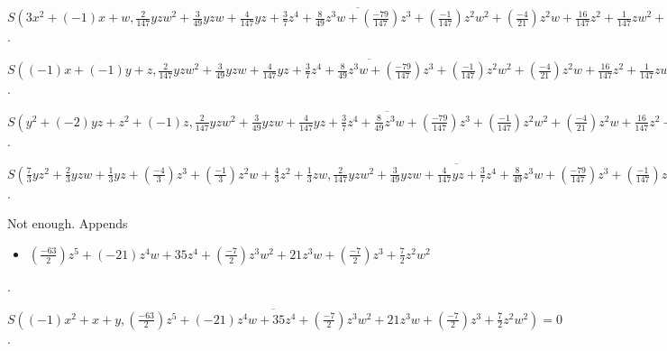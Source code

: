 $\overline{S(3x^{2}+(-1)x+w, \frac{2}{147}yzw^{2}+\frac{3}{49}yzw+\frac{4}{147}yz+\frac{3}{7}z^{4}+\frac{8}{49}z^{3}w+(\frac{-79}{147})z^{3}+(\frac{-1}{147})z^{2}w^{2}+(\frac{-4}{21})z^{2}w+\frac{16}{147}z^{2}+\frac{1}{147}zw^{2}+\frac{4}{147}zw)} = (\frac{-1}{84})yzw+(\frac{-1}{21})yz+(\frac{-63}{2})z^{5}+(\frac{-39}{2})z^{4}w+\frac{137}{4}z^{4}+(\frac{-5}{2})z^{3}w^{2}+\frac{113}{6}z^{3}w+(\frac{-215}{84})z^{3}+\frac{1}{6}z^{2}w^{3}+\frac{29}{12}z^{2}w^{2}+\frac{5}{7}z^{2}w+(\frac{-4}{21})z^{2}+(\frac{-1}{6})zw^{3}+\frac{1}{12}zw^{2}+(\frac{-1}{21})zw$.

$\overline{S((-1)x+(-1)y+z, \frac{2}{147}yzw^{2}+\frac{3}{49}yzw+\frac{4}{147}yz+\frac{3}{7}z^{4}+\frac{8}{49}z^{3}w+(\frac{-79}{147})z^{3}+(\frac{-1}{147})z^{2}w^{2}+(\frac{-4}{21})z^{2}w+\frac{16}{147}z^{2}+\frac{1}{147}zw^{2}+\frac{4}{147}zw)} = (\frac{-1}{4})yzw+(-1)yz+(\frac{-27}{2})z^{5}+(-9)z^{4}w+\frac{69}{4}z^{4}+(\frac{-3}{2})z^{3}w^{2}+\frac{21}{2}z^{3}w+(\frac{-7}{4})z^{3}+\frac{7}{4}z^{2}w^{2}+(\frac{-1}{2})z^{2}w+(-2)z^{2}+(\frac{-1}{4})zw^{2}+(-1)zw$.

$\overline{S(y^{2}+(-2)yz+z^{2}+(-1)z, \frac{2}{147}yzw^{2}+\frac{3}{49}yzw+\frac{4}{147}yz+\frac{3}{7}z^{4}+\frac{8}{49}z^{3}w+(\frac{-79}{147})z^{3}+(\frac{-1}{147})z^{2}w^{2}+(\frac{-4}{21})z^{2}w+\frac{16}{147}z^{2}+\frac{1}{147}zw^{2}+\frac{4}{147}zw)} = \frac{1}{4}yzw+yz+(-18)z^{5}+(-12)z^{4}w+\frac{71}{4}z^{4}+(-2)z^{3}w^{2}+\frac{21}{2}z^{3}w+(\frac{-7}{4})z^{3}+\frac{7}{4}z^{2}w^{2}+\frac{1}{2}z^{2}w+2z^{2}+\frac{1}{4}zw^{2}+zw$.

$\overline{S(\frac{7}{3}yz^{2}+\frac{2}{3}yzw+\frac{1}{3}yz+(\frac{-4}{3})z^{3}+(\frac{-1}{3})z^{2}w+\frac{4}{3}z^{2}+\frac{1}{3}zw, \frac{2}{147}yzw^{2}+\frac{3}{49}yzw+\frac{4}{147}yz+\frac{3}{7}z^{4}+\frac{8}{49}z^{3}w+(\frac{-79}{147})z^{3}+(\frac{-1}{147})z^{2}w^{2}+(\frac{-4}{21})z^{2}w+\frac{16}{147}z^{2}+\frac{1}{147}zw^{2}+\frac{4}{147}zw)} = (\frac{-63}{2})z^{5}+(-21)z^{4}w+35z^{4}+(\frac{-7}{2})z^{3}w^{2}+21z^{3}w+(\frac{-7}{2})z^{3}+\frac{7}{2}z^{2}w^{2}$.

Not enough.  Appends \begin{itemize}
\item $(\frac{-63}{2})z^{5}+(-21)z^{4}w+35z^{4}+(\frac{-7}{2})z^{3}w^{2}+21z^{3}w+(\frac{-7}{2})z^{3}+\frac{7}{2}z^{2}w^{2}$
\end{itemize}  .


$\overline{S((-1)x^{2}+x+y, (\frac{-63}{2})z^{5}+(-21)z^{4}w+35z^{4}+(\frac{-7}{2})z^{3}w^{2}+21z^{3}w+(\frac{-7}{2})z^{3}+\frac{7}{2}z^{2}w^{2})} = 0$.


